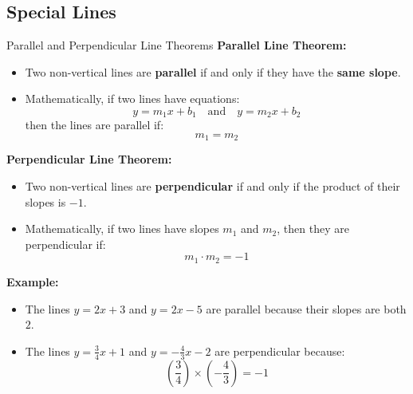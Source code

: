 \documentclass{beamer}
\begin{document}
\begin{frame}
\section{Special Lines}
\end{frame}
\begin{frame}{Parallel and Perpendicular Line Theorems}
    \textbf{Parallel Line Theorem:}
    \begin{itemize}
        \item Two non-vertical lines are \textbf{parallel} if and only if they have the \textbf{same slope}.
        \item Mathematically, if two lines have equations:
        \[
        y = m_1x + b_1 \quad \text{and} \quad y = m_2x + b_2
        \]
        then the lines are parallel if:
        \[
        m_1 = m_2
        \]
    \end{itemize}

\pause
    \vspace{0.5cm}
    \textbf{Perpendicular Line Theorem:}
    \begin{itemize}
        \item Two non-vertical lines are \textbf{perpendicular} if and only if the product of their slopes is \(-1\).
        \item Mathematically, if two lines have slopes \( m_1 \) and \( m_2 \), then they are perpendicular if:
        \[
        m_1 \cdot m_2 = -1
        \]
    \end{itemize}

    \vspace{0.5cm}
    \textbf{Example:}
    \begin{itemize}
        \item The lines \( y = 2x + 3 \) and \( y = 2x - 5 \) are parallel because their slopes are both \( 2 \).
        \item The lines \( y = \frac{3}{4}x + 1 \) and \( y = -\frac{4}{3}x - 2 \) are perpendicular because:
        \[
        \left(\frac{3}{4} \right) \times \left(-\frac{4}{3} \right) = -1
        \]
    \end{itemize}
\end{frame}
\end{document}
